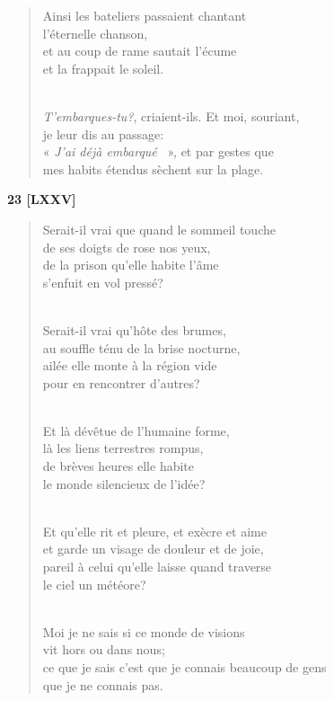 \documentclass[a4paper,12pt]{book}
\begin{document}
\begin{verse}
Ainsi les bateliers passaient chantant \\
l'éternelle chanson, \\
et au coup de rame sautait l'écume \\
et la frappait le soleil. \\ \

{\em T'embarques-tu?}, criaient-ils. Et moi, souriant, \\
je leur dis au passage: \\
« {\em J'ai déjà embarqué} ~», et par gestes que \\
mes habits étendus sèchent sur la plage. \\
\end{verse}

\bigskip

\begin{center} {\bf 23 [LXXV]} \end{center}

\begin{verse}
Serait-il vrai que quand le sommeil touche \\
de ses doigts de rose nos yeux, \\
de la prison qu'elle habite l'âme \\
s'enfuit en vol pressé? \\ \

Serait-il vrai qu'hôte des brumes, \\
au souffle ténu de la brise nocturne, \\
ailée elle monte à la région vide \\
pour en rencontrer d'autres? \\ \


Et là dévêtue de l'humaine forme, \\
là les liens terrestres rompus, \\
de brèves heures elle habite \\
le monde silencieux de l'idée? \\ \

Et qu'elle rit et pleure, et exècre et aime \\
et garde un visage de douleur et de joie, \\
pareil à celui qu'elle laisse quand traverse \\
le ciel un météore? \\ \

Moi je ne sais si ce monde de visions \\
vit hors ou dans nous; \\
ce que je sais c'est que je connais beaucoup de gens \\
que je ne connais pas. \\
\end{verse}
\end{document}
